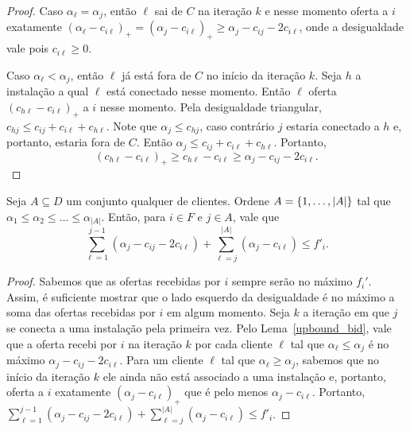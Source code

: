 \begin{proof}
Caso $\alpha_\ell = \alpha_j$, então $\ell$ sai de $C$ na iteração $k$ e nesse momento oferta a $i$ exatamente $(\alpha_\ell - c_{i\ell})_+ = (\alpha_j - c_{i\ell})_+ \geq \alpha_j - c_{ij} - 2c_{i\ell}$, onde a desigualdade vale pois $c_{i\ell} \geq 0$.

Caso $\alpha_\ell < \alpha_j $, então $\ell$ já está fora de $C$ no início da iteração $k$. 
Seja $h$ a instalação a qual $\ell$ está conectado nesse momento. 
Então $\ell$ oferta $(c_{h\ell} - c_{i\ell})_+$ a $i$ nesse momento. 
Pela desigualdade triangular, $c_{hj} \leq c_{ij} + c_{i\ell} + c_{h\ell}$. 
Note que $\alpha_j \leq c_{hj}$, caso contrário $j$ estaria conectado a $h$ e, portanto, estaria fora de $C$. Então $\alpha_j \leq c_{ij} + c_{i\ell } + c_{h\ell}$. 
Portanto,
\[ (c_{h\ell} - c_{i\ell})_+ \geq c_{h\ell} - c_{i\ell} \geq \alpha_j - c_{ij} - 2c_{i\ell}.
\]
\end{proof}
\begin{lemma}
\label{lowerbound_fcost}
Seja $A \subseteq D$ um conjunto qualquer de clientes. Ordene $A = \{1,\ldots,|A|\}$ tal que $\alpha_1 \leq \alpha_2 \leq \ldots \leq \alpha_{|A|}$. Então, para $i \in F$ e $j \in A$, vale que
\[ \sum_{\ell=1}^{j-1}(\alpha_j - c_{ij} - 2c_{i\ell}) + \sum_{\ell= j}^{|A|}(\alpha_j - c_{i\ell}) \leq f'_i.
\]
\end{lemma}
\begin{proof}
Sabemos que as ofertas recebidas por $i$ sempre serão no máximo $f_i'$. Assim, é suficiente mostrar que o lado esquerdo da desigualdade é no máximo a soma das ofertas recebidas por $i$ em algum momento. Seja $k$ a iteração em que $j$ se conecta a uma instalação pela primeira vez. Pelo Lema~\ref{upbound_bid}, vale que a oferta recebi por $i$ na iteração $k$ por cada cliente $\ell$ tal que $\alpha_\ell \leq \alpha_j$ é no máximo $\alpha_j - c_{ij} - 2c_{i\ell}$. Para um cliente $\ell$ tal que $\alpha_\ell \geq \alpha_j$, sabemos que no início da iteração $k$ ele ainda não está associado a uma instalação e, 
portanto, oferta a $i$ exatamente $(\alpha_j - c_{i\ell})_+$  que é pelo menos $\alpha_j - c_{i\ell}$. Portanto, $\sum_{\ell=1}^{j-1}(\alpha_j - c_{ij} - 2c_{i\ell}) + \sum_{\ell= j}^{|A|}(\alpha_j - c_{i\ell}) \leq f'_i$.
\end{proof}


